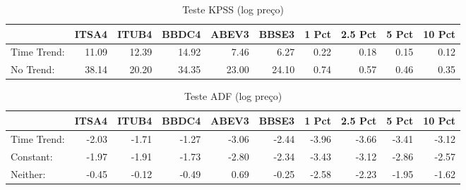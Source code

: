 \documentclass[]{article}
\newenvironment{Shaded}{\begin{snugshade}}{\end{snugshade}}
\newcommand{\KeywordTok}[1]{\textcolor[rgb]{0.13,0.29,0.53}{\textbf{{#1}}}}
\newcommand{\DataTypeTok}[1]{\textcolor[rgb]{0.13,0.29,0.53}{{#1}}}
\newcommand{\DecValTok}[1]{\textcolor[rgb]{0.00,0.00,0.81}{{#1}}}
\newcommand{\StringTok}[1]{\textcolor[rgb]{0.31,0.60,0.02}{{#1}}}
\newcommand{\OtherTok}[1]{\textcolor[rgb]{0.56,0.35,0.01}{{#1}}}
\newcommand{\NormalTok}[1]{{#1}}
\begin{document}
\begin{longtable}[t]{lrrrrrrrrr}
\caption{\label{tab:unnamed-chunk-11}Teste KPSS (log preço)}\\
\toprule
  & ITSA4 & ITUB4 & BBDC4 & ABEV3 & BBSE3 & 1 Pct & 2.5 Pct & 5 Pct & 10 Pct\\
\midrule
Time Trend: & 11.09 & 12.39 & 14.92 & 7.46 & 6.27 & 0.22 & 0.18 & 0.15 & 0.12\\
No Trend: & 38.14 & 20.20 & 34.35 & 23.00 & 24.10 & 0.74 & 0.57 & 0.46 & 0.35\\
\bottomrule
\end{longtable}

\begin{Shaded}
\end{Shaded}

\begin{longtable}[t]{lrrrrrrrrr}
\caption{\label{tab:unnamed-chunk-11}Teste ADF (log preço)}\\
\toprule
  & ITSA4 & ITUB4 & BBDC4 & ABEV3 & BBSE3 & 1 Pct & 2.5 Pct & 5 Pct & 10 Pct\\
\midrule
Time Trend: & -2.03 & -1.71 & -1.27 & -3.06 & -2.44 & -3.96 & -3.66 & -3.41 & -3.12\\
Constant: & -1.97 & -1.91 & -1.73 & -2.80 & -2.34 & -3.43 & -3.12 & -2.86 & -2.57\\
Neither: & -0.45 & -0.12 & -0.49 & 0.69 & -0.25 & -2.58 & -2.23 & -1.95 & -1.62\\
\bottomrule
\end{longtable}

\begin{Shaded}
\end{Shaded}
\end{document}
